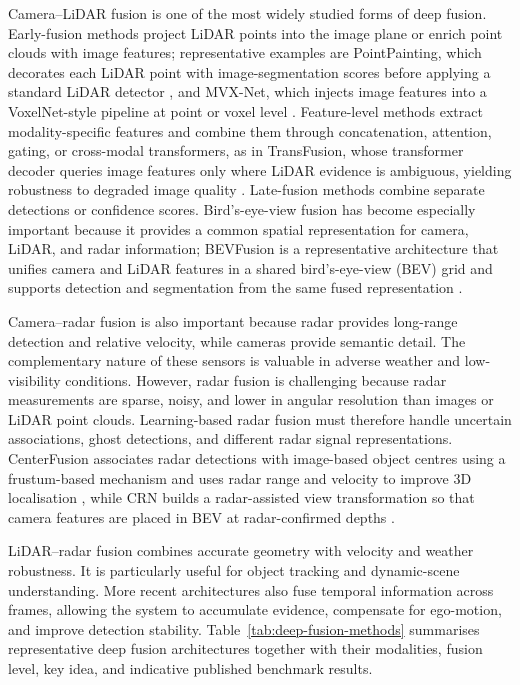 Camera--LiDAR fusion is one of the most widely studied forms of deep fusion. Early-fusion methods project LiDAR points into the image plane or enrich point clouds with image features; representative examples are PointPainting, which decorates each LiDAR point with image-segmentation scores before applying a standard LiDAR detector \cite{vora2020_pointpainting}, and MVX-Net, which injects image features into a VoxelNet-style pipeline at point or voxel level \cite{sindagi2019_mvxnet}. Feature-level methods extract modality-specific features and combine them through concatenation, attention, gating, or cross-modal transformers, as in TransFusion, whose transformer decoder queries image features only where LiDAR evidence is ambiguous, yielding robustness to degraded image quality \cite{bai2022_transfusion}. Late-fusion methods combine separate detections or confidence scores. Bird's-eye-view fusion has become especially important because it provides a common spatial representation for camera, LiDAR, and radar information; BEVFusion is a representative architecture that unifies camera and LiDAR features in a shared bird's-eye-view (BEV) grid and supports detection and segmentation from the same fused representation \cite{liu2023_bevfusion}.

Camera--radar fusion is also important because radar provides long-range detection and relative velocity, while cameras provide semantic detail. The complementary nature of these sensors is valuable in adverse weather and low-visibility conditions. However, radar fusion is challenging because radar measurements are sparse, noisy, and lower in angular resolution than images or LiDAR point clouds. Learning-based radar fusion must therefore handle uncertain associations, ghost detections, and different radar signal representations. CenterFusion associates radar detections with image-based object centres using a frustum-based mechanism and uses radar range and velocity to improve 3D localisation \cite{nabati2021_centerfusion}, while CRN builds a radar-assisted view transformation so that camera features are placed in BEV at radar-confirmed depths \cite{kim2023_crn}.

LiDAR--radar fusion combines accurate geometry with velocity and weather robustness. It is particularly useful for object tracking and dynamic-scene understanding. More recent architectures also fuse temporal information across frames, allowing the system to accumulate evidence, compensate for ego-motion, and improve detection stability. Table~\ref{tab:deep-fusion-methods} summarises representative deep fusion architectures together with their modalities, fusion level, key idea, and indicative published benchmark results.

